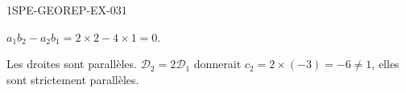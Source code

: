 \begin{corrige}{1SPE-GEOREP-EX-031}


$a_1 b_2 - a_2 b_1 = 2 \times 2 - 4 \times 1 = 0$.

Les droites sont parallèles. $\mathcal{D}_2 = 2\mathcal{D}_1$ donnerait $c_2 = 2 \times (-3) = -6
\neq 1$, elles sont strictement parallèles.

\end{corrige}

